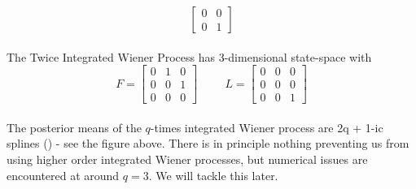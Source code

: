 {$$\begin{bmatrix}
        0 & 0 \\ 
        0 & 1 
    \end{bmatrix}$$
    \\ The Twice Integrated Wiener Process has 3-dimensional state-space with $$F=\begin{bmatrix}
        0 & 1 & 0 \\ 0 & 0 & 1 \\ 0 & 0 & 0
    \end{bmatrix} \hspace{1cm} L=\begin{bmatrix}
        0 & 0 & 0 \\ 0 & 0 & 0 \\ 0 & 0 & 1
    \end{bmatrix}$$
    \\ The posterior means of the $q$-times integrated Wiener process are 2q + 1-ic splines (\cite{probnum}) - see the figure above. There is in principle nothing preventing us from using higher order integrated Wiener processes, but numerical issues are encountered at around $q=3$. We will tackle this later.
}
\newpage
